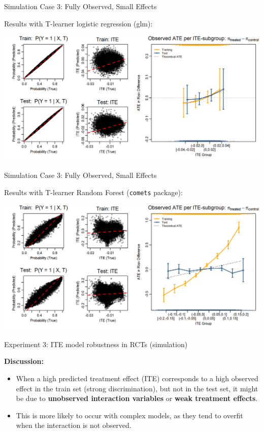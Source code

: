 \documentclass[onlytextwidth,english]{beamer}\usepackage[]{graphicx}\usepackage[]{xcolor}
\begin{document}
\begin{frame}{Simulation Case 3: Fully Observed, Small Effects}

Results with T-learner logistic regression (glm):

\includegraphics[width=\textwidth]{img/small_interaction_glm_tlearner.png}

\end{frame}


\begin{frame}{Simulation Case 3: Fully Observed, Small Effects}

Results with T-learner Random Forest (\texttt{comets} package):

\includegraphics[width=\textwidth]{img/small_interaction_tuned_rf_tlearner.png}

\end{frame}





\begin{frame}{Experiment 3:  ITE model robustness in RCTs (simulation)}

\textbf{Discussion:} 

\begin{itemize}
    \item When a high predicted treatment effect (ITE) corresponds to a high observed effect in the train set (strong discrimination), but not in the test set, it might be due to \textbf{unobserved interaction variables} or \textbf{weak treatment effects}.
    \item This is more likely to occur with complex models, as they tend to overfit when the interaction is not observed.
\end{itemize}


\end{frame}
\end{document}
